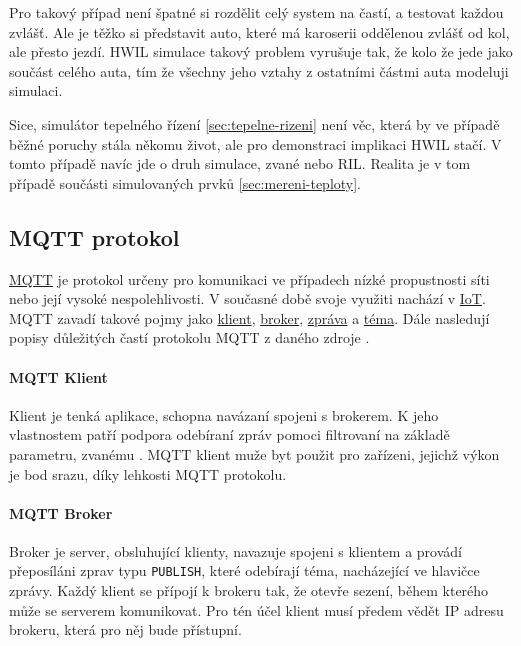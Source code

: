 Pro takový případ není špatné si rozdělit celý system na častí, a testovat každou zvlášť. Ale je těžko si představit auto, které má karoserii oddělenou zvlášť od kol, ale přesto jezdí. HWIL simulace takový problem vyrušuje tak, že kolo  že jede jako součást celého auta, tím že všechny jeho vztahy z ostatními částmi auta modeluji simulaci.

Sice, simulátor tepelného řízení \ref{sec:tepelne-rizeni} není věc, která by ve případě běžné poruchy stála někomu život, ale pro demonstraci implikaci HWIL stačí. V tomto případě navíc jde o druh simulace, zvané  nebo RIL. Realita je v tom případě součásti simulovaných prvků \ref{sec:mereni-teploty}.

\subsection{MQTT protokol}
\label{subsec:mqtt-proto}

\href{http://mqtt.org/}{MQTT} je protokol určeny pro komunikaci ve případech nízké propustnosti síti nebo její vysoké nespolehlivosti. V současné době svoje využiti nachází v \href{https://en.wikipedia.org/wiki/Internet_of_things}{IoT}. MQTT zavadí takové pojmy jako \hyperref[par:client]{klient}, \hyperref[par:broker]{broker}, \hyperref[par:message]{zpráva} a \hyperref[par:topic]{téma}. Dále nasledují popisy důležitých častí protokolu MQTT z daného zdroje \cite{mqtt}.

\paragraph{MQTT Klient}
\label{par:client}

Klient je tenká aplikace, schopna navázaní spojeni s brokerem. K jeho vlastnostem patří podpora odebíraní zpráv pomoci filtrovaní na základě parametru, zvanému \hyperref[par:topic]{}. MQTT klient muže byt použit pro zařízeni, jejichž výkon je bod srazu, díky lehkosti MQTT protokolu.

\paragraph{MQTT Broker}
\label{par:broker}

Broker je server, obsluhující klienty, navazuje spojeni s klientem a provádí přeposíláni zprav typu \texttt{PUBLISH}, které odebírají téma, nacházející ve hlavičce zprávy. Každý klient se přípojí k brokeru tak, že otevře sezení, během kterého může se serverem komunikovat. Pro tén účel klient musí předem vědět IP adresu brokeru, která pro něj bude přístupní.

